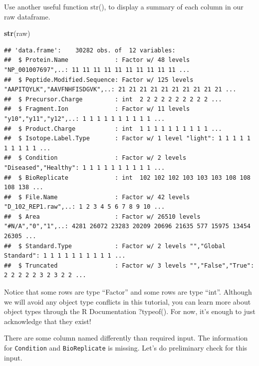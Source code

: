 \documentclass[]{book}
\newenvironment{Shaded}{\begin{snugshade}}{\end{snugshade}}
\newcommand{\CommentTok}[1]{\textcolor[rgb]{0.56,0.35,0.01}{\textit{#1}}}
\newcommand{\KeywordTok}[1]{\textcolor[rgb]{0.13,0.29,0.53}{\textbf{#1}}}
\newcommand{\NormalTok}[1]{#1}
\newcommand{\OperatorTok}[1]{\textcolor[rgb]{0.81,0.36,0.00}{\textbf{#1}}}
\begin{document}
Use another useful function str(), to display a summary of each column in our raw dataframe.

\begin{Shaded}
\begin{Highlighting}[]
\KeywordTok{str}\NormalTok{(raw)}
\end{Highlighting}
\end{Shaded}

\begin{verbatim}
## 'data.frame':    30282 obs. of  12 variables:
##  $ Protein.Name             : Factor w/ 48 levels "NP_001007697",..: 11 11 11 11 11 11 11 11 11 11 ...
##  $ Peptide.Modified.Sequence: Factor w/ 125 levels "AAPITQYLK","AAVFNHFISDGVK",..: 21 21 21 21 21 21 21 21 21 21 ...
##  $ Precursor.Charge         : int  2 2 2 2 2 2 2 2 2 2 ...
##  $ Fragment.Ion             : Factor w/ 11 levels "y10","y11","y12",..: 1 1 1 1 1 1 1 1 1 1 ...
##  $ Product.Charge           : int  1 1 1 1 1 1 1 1 1 1 ...
##  $ Isotope.Label.Type       : Factor w/ 1 level "light": 1 1 1 1 1 1 1 1 1 1 ...
##  $ Condition                : Factor w/ 2 levels "Diseased","Healthy": 1 1 1 1 1 1 1 1 1 1 ...
##  $ BioReplicate             : int  102 102 102 103 103 103 108 108 108 138 ...
##  $ File.Name                : Factor w/ 42 levels "D_102_REP1.raw",..: 1 2 3 4 5 6 7 8 9 10 ...
##  $ Area                     : Factor w/ 26510 levels "#N/A","0","1",..: 4281 26072 23283 20209 20696 21635 577 15975 13454 26305 ...
##  $ Standard.Type            : Factor w/ 2 levels "","Global Standard": 1 1 1 1 1 1 1 1 1 1 ...
##  $ Truncated                : Factor w/ 3 levels "","False","True": 2 2 2 2 2 3 2 3 2 2 ...
\end{verbatim}

Notice that some rows are type ``Factor'' and some rows are type ``int''. Although we will avoid any object type conflicts in this tutorial, you can learn more about object types through the R Documentation ?typeof(). For now, it's enough to just acknowledge that they exist!

There are some column named differently than required input. The information for \texttt{Condition} and \texttt{BioReplicate} is missing. Let's do preliminary check for this input.

\begin{Shaded}
\end{Shaded}
\end{document}
